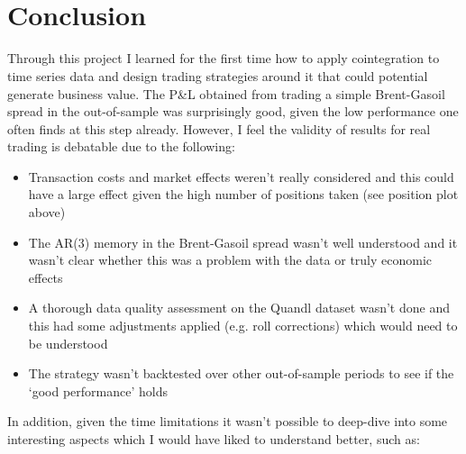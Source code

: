 \documentclass[11pt]{article}
\providecommand{\tightlist}{%
      \setlength{\itemsep}{0pt}\setlength{\parskip}{0pt}}
\begin{document}
    \begin{figure}[!ht] 
        \begin{center}

    \end{center}
    \caption{} \label{figpnl}
    \end{figure}

        { \hspace*{\fill} \\}
        
        { \hspace*{\fill} \\}
        
    \begin{center}
    \end{center}


\clearpage
    
        \section{Conclusion}\label{conclusion}
    
Through this project I learned for the first time how to apply cointegration to time series data and  design trading strategies around it that could potential generate business value. The P\&L  obtained from trading a simple Brent-Gasoil spread in the out-of-sample was surprisingly good, given the low performance one often finds at this step already. However, I feel the validity of results for real trading is debatable due to the following:

\begin{itemize}
\tightlist

\item Transaction costs and market effects weren't really considered and this could have a large effect given the high number of positions taken (see position plot above)

\item The AR(3) memory in the Brent-Gasoil spread wasn't well understood and it wasn't clear whether this was a problem with the  data or truly economic effects

\item A thorough data quality assessment on the Quandl dataset wasn't done and this had some adjustments applied (e.g. roll corrections) which would need to be  understood

\item The strategy wasn't backtested over other out-of-sample periods to see if the `good performance'  holds

\end{itemize} 
In addition, given the time limitations it wasn't possible to deep-dive into some interesting aspects which I would have liked to understand better, such as:
\end{document}
